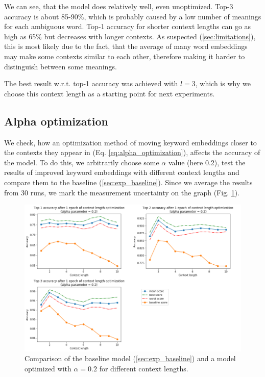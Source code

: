 \documentclass{llncs}
\begin{document}
We can see, that the model does relatively well, even unoptimized.
Top-3 accuracy is about 85-90\%, which is probably caused by a low number of meanings for each ambiguous word.
Top-1 accuracy for shorter context lengths can go as high as 65\% but decreases with longer contexts.
As suspected (\ref{sec:limitations}), this is most likely due to the fact, that the average of many word embeddings may make some contexts similar to each other, therefore making it harder to distinguish between some meanings.

The best result w.r.t. top-1 accuracy was achieved with \(l=3\), which is why we choose this context length as a starting point for next experiments.

\subsection{Alpha optimization}
\label{sec:exp_alpha}
We check, how an optimization method of moving keyword embeddings closer to the contexts they appear in (Eq. \ref{eq:alpha_optimization}), affects the accuracy of the model.
To do this, we arbitrarily choose some \(\alpha\) value (here 0.2), test the results of improved keyword embeddings with different context lengths and compare them to the baseline (\ref{sec:exp_baseline}). Since we average the results from 30 runs, we mark the measurement uncertainty on the graph (Fig. \ref{fig:exp1_optimization}).

\begin{figure}
    \centering
    \caption{Comparison of the baseline model (\ref{sec:exp_baseline}) and a model optimized with \(\alpha=0.2\) for different context lengths.}
    \label{fig:exp1_optimization}
    \includegraphics[scale=0.65]{res/exp1_context_top_acc.png}
\end{figure}
\end{document}
